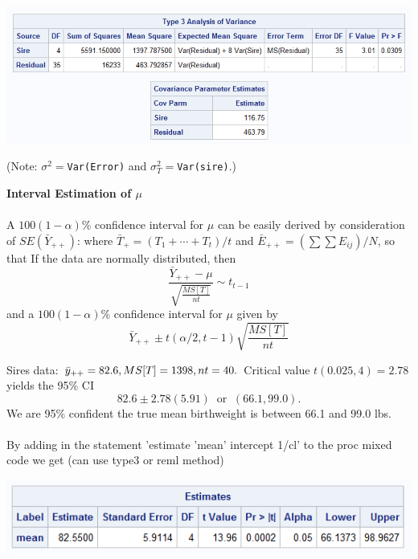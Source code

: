 \begin{center}
\includegraphics[scale=0.8]{Sire2}
\end{center}

(Note:  $\sigma^2=${\tt Var(Error)}  and $\sigma_T^2=${\tt Var(sire)}.)  

\newpage

\newpage
\textbf{Interval Estimation of $\mu$}\\~\\
A $100(1-\alpha)\%$ confidence interval for $\mu$ can be easily derived by consideration of $SE(\bar{Y}_{++})$:
where $\bar{T}_{+}=(T_1 + \cdots + T_t)/t$ and $\bar{E}_{++}=(\sum \sum E_{ij})/N$,
so that
If the data are normally distributed, then 
$$\frac{\bar{Y}_{++}-\mu}{\sqrt{\frac{MS[T]}{nt}}} \sim t_{t-1}$$
and a $100(1-\alpha)\%$ confidence interval for $\mu$ given by
$$\bar{Y}_{++} \pm t(\alpha/2,t-1) \sqrt{\frac{MS[T]}{nt}}$$

Sires data: $\bar{y}_{++}=82.6, MS[T]=1398, nt=40.$ 
Critical value $t(0.025,4)=2.78$ yields the 95\% CI
$$82.6 \pm 2.78 (5.91) \ \mbox{ or } \ (66.1,99.0).$$
We are 95\% confident the true mean birthweight is between 66.1 and 99.0 lbs.\\~\\
By adding in the statement 'estimate 'mean' intercept 1/cl' to the proc mixed code we get (can use type3 or reml method)
\begin{center}
\includegraphics[scale=0.8]{Sire3}
\end{center}

